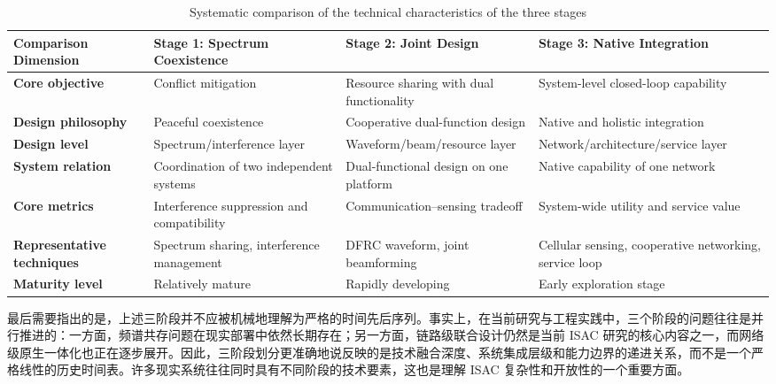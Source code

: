 \begin{table}[!ht]
\centering
\small
\renewcommand{\arraystretch}{1.2}
\setlength{\tabcolsep}{4pt}
\begin{tabularx}{\textwidth}{|>{\centering\arraybackslash}p{2.5cm}|
                             >{\centering\arraybackslash}X|
                             >{\centering\arraybackslash}X|
                             >{\centering\arraybackslash}X|}
\hline
\textbf{Comparison Dimension} & 
\textbf{Stage 1: Spectrum Coexistence} & 
\textbf{Stage 2: Joint Design} & 
\textbf{Stage 3: Native Integration} \\
\hline
\textbf{Core objective} & 
Conflict mitigation & 
Resource sharing with dual functionality & 
System-level closed-loop capability \\
\hline
\textbf{Design philosophy} & 
Peaceful coexistence & 
Cooperative dual-function design & 
Native and holistic integration \\
\hline
\textbf{Design level} & 
Spectrum/interference layer & 
Waveform/beam/resource layer & 
Network/\allowbreak architecture/\allowbreak service layer \\
\hline
\textbf{System relation} & 
Coordination of two independent systems & 
Dual-functional design on one platform & 
Native capability of one network \\
\hline
\textbf{Core metrics} & 
Interference suppression and compatibility & 
Communication--sensing tradeoff & 
System-wide utility and service value \\
\hline
\textbf{Representative techniques} & 
Spectrum sharing, interference management & 
DFRC waveform, joint beamforming & 
Cellular sensing, cooperative networking, service loop \\
\hline
\textbf{Maturity level} & 
Relatively mature & 
Rapidly developing & 
Early exploration stage \\
\hline
\end{tabularx}
\caption{Systematic comparison of the technical characteristics of the three stages}
\label{tab:stage-comparison}
\end{table}

最后需要指出的是，上述三阶段并不应被机械地理解为严格的时间先后序列。事实上，在当前研究与工程实践中，三个阶段的问题往往是并行推进的：一方面，频谱共存问题在现实部署中依然长期存在；另一方面，链路级联合设计仍然是当前 ISAC 研究的核心内容之一，而网络级原生一体化也正在逐步展开\cite{Liu2022ISAC,Gonzalez2024integrated,Cui2024integrated}。因此，三阶段划分更准确地说反映的是技术融合深度、系统集成层级和能力边界的递进关系，而不是一个严格线性的历史时间表。许多现实系统往往同时具有不同阶段的技术要素，这也是理解 ISAC 复杂性和开放性的一个重要方面。

